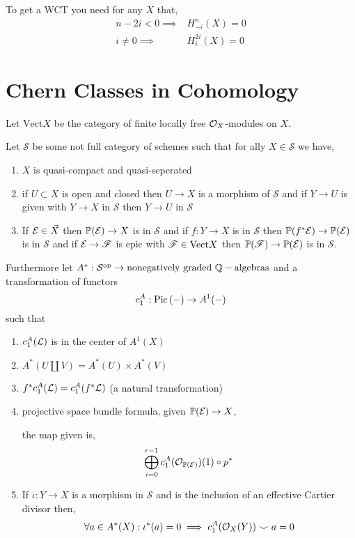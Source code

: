 \documentclass[12pt]{article}
\begin{document}
\begin{remark}
To get a WCT you need for any $X$ that,
\begin{align*}
n - 2 i < 0 \implies & H^n_{-i}(X) = 0 
\\
i \neq 0 \implies & H^{2 i}_i(X) = 0 
\end{align*}
\end{remark}

\section{Chern Classes in Cohomology}

\newcommand{\Vect}{\mathrm{Vect}}
\renewcommand{\S}{\mathcal{S}}

\begin{definition}
Let $\Vect{X}$ be the category of finite locally free $\mathcal{O}_{X}$-modules on $X$.
\end{definition}

\begin{remark}
Let $\S$ be some not full category of schemes such that for ally $X \in \S$ we have,
\begin{enumerate}
\item $X$ is quasi-compact and quasi-seperated
\item if $U \subset X$ is open and closed then $U \to X$ is a morphism of $\S$ and if $Y \to U$ is given with $Y \to X$ in $\S$ then $Y \to U$ in $\S$
\item If $\mathcal{E} \in \Vec{X}$ then $\mathbb{P}(\mathcal{E}) \to X$ is in $\S$ and if $f : Y \to X$ is in $\S$ then $\mathbb{P}(f^* \mathcal{E}) \to \mathbb{P}(\mathcal{E})$ is in $\S$ and if $\mathcal{E} \to \mathscr{F}$ is epic with $\F \in \Vect{X}$ then $\mathbb{P}(\mathscr{F}) \to \mathbb{P}(\mathcal{E})$ is in $\S$. 
\end{enumerate}
Furthermore let $A^* : \S^{\op} \to \text{nonegatively graded } \Q-\text{algebras}$ and a transformation of functors
\[ c_1^A : \mathrm{Pic} \left( - \right) \to A^1(-) \] 
such that
\begin{enumerate}
\item $c_1^A(\mathcal{L})$ is in the center of $A^1(X)$
\item $A^*(U \coprod V) = A^*(U) \times A^*(V)$
\item $f^* c_1^A(\mathcal{L}) = c_1^A(f^* \mathcal{L})$ (a natural transformation)
\item projective space bundle formula, given $\mathbb{P}(\mathcal{E}) \to X$,
\begin{center}
\end{center}
the map given is,
\[ \bigoplus_{i = 0}^{r - 1} c_1^A(\mathcal{O}_{\mathbb{P}(\mathcal{E})}) (1) \circ p^* \]
\item If $\iota : Y \to X$ is a morphism in $\S$ and is the inclusion of an effective Cartier divisor then,
\[ \forall a \in A^*(X) : \iota^*(a) = 0 \implies c^A_1(\mathcal{O}_{X}(Y)) \smile a = 0 \]
\end{enumerate}
\end{remark}
\end{document}
